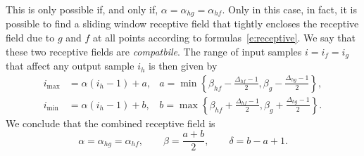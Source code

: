 This is only possible if, and only if, $\alpha = \alpha_{hg} = \alpha_{hf}$. Only in this case, in fact, it is possible to find a sliding window receptive field that tightly encloses the receptive field due to $g$ and $f$ at all points according to formulas~\eqref{e:receptive}. We say that these two receptive fields are \emph{compatbile}. The range of input samples $i = i_f = i_g$ that affect any output sample $i_h$ is then given by
\begin{align*}
	  i_\text{max}&=
  \alpha (i_h- 1) + a, & a = \min
  \left\{\beta_{hf}- \frac{\Delta_{hf} - 1}{2}, \beta_g - \frac{\Delta_{hg} - 1}{2}\right\},
  \\
  	  i_\text{min} &=
  \alpha (i_h- 1) + b, & b = \max
  \left\{\beta_{hf}+ \frac{\Delta_{hf} - 1}{2}, \beta_g + \frac{\Delta_{hg} - 1}{2}\right\}.
\end{align*}
We conclude that the combined receptive field is
\[
\alpha = \alpha_{hg} = \alpha_{hf},
\qquad
\beta = \frac{a+b}{2},
\qquad
\delta = b - a + 1.
\]



